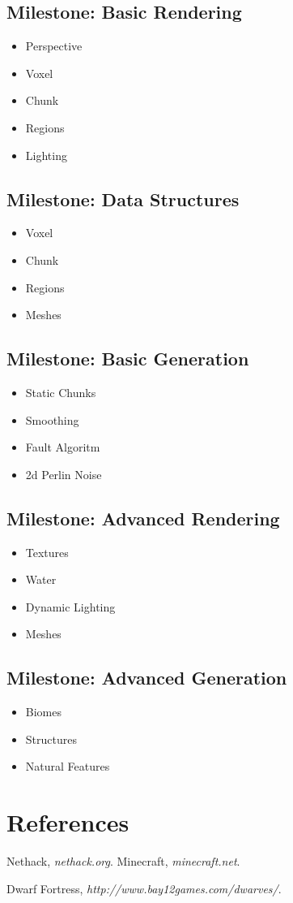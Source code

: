 \documentclass[a4paper,12pt,notitlepage]{article}
\begin{document}
\subsection*{Milestone: Basic Rendering}
\begin{itemize}

\item Perspective
\item Voxel
\item Chunk
\item Regions 
\item Lighting
\end{itemize}

\subsection*{Milestone: Data Structures}
\begin{itemize}
\item Voxel
\item Chunk
\item Regions
\item Meshes
\end{itemize}

\subsection*{Milestone: Basic Generation}
\begin{itemize}
\item Static Chunks
\item Smoothing
\item Fault Algoritm
\item 2d Perlin Noise
\end{itemize}

\subsection*{Milestone: Advanced Rendering}
\begin{itemize}
\item Textures
\item Water
\item Dynamic Lighting
\item Meshes
\end{itemize}

\subsection*{Milestone: Advanced Generation}
\begin{itemize}
\item Biomes
\item Structures\
\item Natural Features
\end{itemize}

\section{References}
\begin{thebibliography}{9}


  Nethack,
  \emph{nethack.org}.
 Minecraft,
 \emph{minecraft.net}.

  Dwarf Fortress,
  \emph{http://www.bay12games.com/dwarves/}.
\end{thebibliography}
\end{document}
